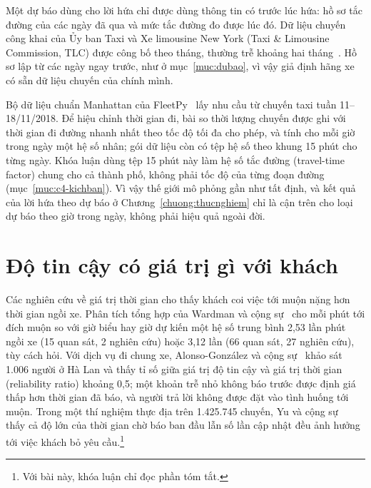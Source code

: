Một dự báo dùng cho lời hứa chỉ được dùng thông tin có trước lúc hứa: hồ sơ tắc đường của các ngày đã qua và mức tắc
đường đo được lúc đó. Dữ liệu chuyến công khai của Ủy ban Taxi và Xe limousine New York (Taxi \& Limousine
Commission, TLC) được công bố theo tháng, thường trễ khoảng hai tháng~\cite{tlc}. Hồ sơ lập từ các ngày ngay trước, như
ở mục~\ref{muc:dubao}, vì vậy giả định hãng xe có sẵn dữ liệu chuyến của chính mình.

Bộ dữ liệu chuẩn Manhattan của FleetPy~\cite{engelhardt2026} lấy nhu cầu từ chuyến taxi tuần 11--18/11/2018. Để hiệu
chỉnh thời gian đi, bài so thời lượng chuyến được ghi với thời gian đi đường nhanh nhất theo tốc độ tối đa cho phép,
và tính cho mỗi giờ trong ngày một hệ số nhân; gói dữ liệu còn có tệp hệ số theo khung 15 phút cho từng ngày. Khóa
luận dùng tệp 15 phút này làm hệ số tắc đường (travel-time factor) chung cho cả thành phố, không phải tốc độ của từng
đoạn đường (mục~\ref{muc:c4-kichban}). Vì vậy thế giới mô phỏng gần như tất định, và kết quả của lời hứa theo dự báo ở
Chương~\ref{chuong:thucnghiem} chỉ là cận trên cho loại dự báo theo giờ trong ngày, không phải hiệu quả ngoài đời.

\section{Độ tin cậy có giá trị gì với khách}
\label{muc:c2-giatri}

Các nghiên cứu về giá trị thời gian cho thấy khách coi việc tới muộn nặng hơn thời gian ngồi xe. Phân tích tổng hợp
của Wardman và cộng sự~\cite{wardman2026} cho mỗi phút tới đích muộn so với giờ biểu hay giờ dự kiến một hệ số trung
bình 2,53 lần phút ngồi xe (15 quan sát, 2 nghiên cứu) hoặc 3,12 lần (66 quan sát, 27 nghiên cứu), tùy cách hỏi. Với
dịch vụ đi chung xe, Alonso-González và cộng sự~\cite{alonsogonzalez2020} khảo sát 1.006 người ở Hà Lan và thấy tỉ số
giữa giá trị độ tin cậy và giá trị thời gian (reliability ratio) khoảng 0,5; một khoản trễ nhỏ không báo trước được
định giá thấp hơn thời gian đã báo, và người trả lời không được đặt vào tình huống tới muộn. Trong một thí nghiệm thực
địa trên 1.425.745 chuyến, Yu và cộng sự~\cite{yu2022} thấy cả độ lớn của thời gian chờ báo ban đầu lẫn số lần cập
nhật đều ảnh hưởng tới việc khách bỏ yêu cầu.\footnote{Với bài này, khóa luận chỉ đọc phần tóm tắt.}

